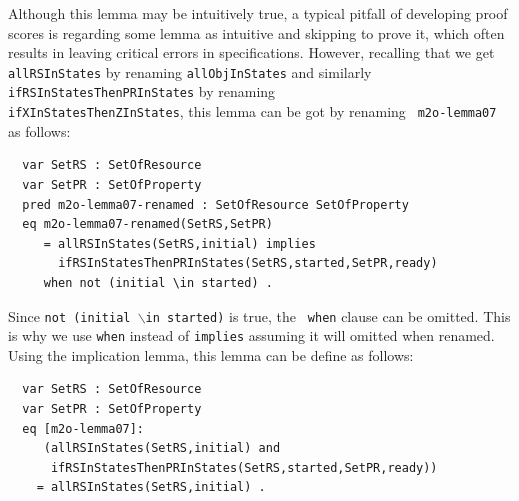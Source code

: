 \documentclass[12pt]{report}
\newcommand{\stt}[1]{{\small{\tt {#1}}}}
\begin{document}
\normalsize
Although this lemma may be intuitively true, a typical pitfall of
developing proof scores is regarding some lemma as intuitive and
skipping to prove it, which often results in leaving critical errors
in specifications. However, recalling that we get {\tt allRSInStates}
by renaming {\tt allObjInStates} and similarly
{\tt ifRSInStatesThenPRInStates} by renaming\\
{\tt ifXInStatesThenZInStates}, this lemma can be got by renaming {\tt
  m2o-lemma07} as follows:
\small
\begin{verbatim}
  var SetRS : SetOfResource
  var SetPR : SetOfProperty
  pred m2o-lemma07-renamed : SetOfResource SetOfProperty
  eq m2o-lemma07-renamed(SetRS,SetPR)
     = allRSInStates(SetRS,initial) implies 
       ifRSInStatesThenPRInStates(SetRS,started,SetPR,ready)
     when not (initial \in started) .
\end{verbatim}
\normalsize
Since \stt{not (initial $\backslash$in started)} is true, the {\tt
  when} clause can be omitted. This is why we use {\tt when} instead
of {\tt implies} assuming it will omitted when renamed. Using the
implication lemma, this lemma can be define as follows:
\small
\begin{verbatim}
  var SetRS : SetOfResource
  var SetPR : SetOfProperty
  eq [m2o-lemma07]:
     (allRSInStates(SetRS,initial) and
      ifRSInStatesThenPRInStates(SetRS,started,SetPR,ready))
    = allRSInStates(SetRS,initial) .
\end{verbatim}
\normalsize
\end{document}
